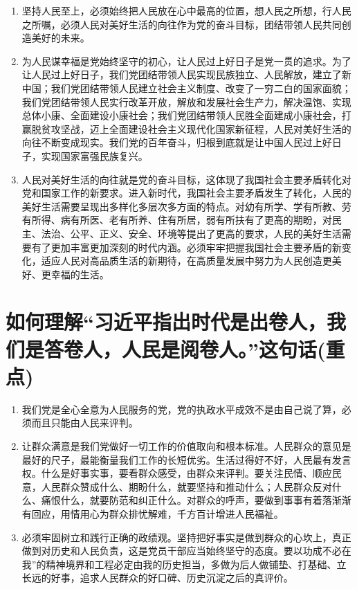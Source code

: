\documentclass[12pt, a4paper, oneside]{ctexbook}
\begin{document}
\begin{enumerate}
\item 坚持人民至上，必须始终把人民放在心中最高的位置，想人民之所想，行人民之所嘱，必须人民对美好生活的向往作为党的奋斗目标，团结带领人民共同创造美好的未来。

\item 为人民谋幸福是党始终坚守的初心，让人民过上好日子是党一贯的追求。为了让人民过上好日子，我们党团结带领人民实现民族独立、人民解放，建立了新中国；我们党团结带领人民建立社会主义制度、改变了一穷二白的国家面貌；我们党团结带领人民实行改革开放，解放和发展社会生产力，解决温饱、实现总体小康、全面建设小康社会；我们党团结带领人民胜全面建成小康社会，打赢脱贫攻坚战，迈上全面建设社会主义现代化国家新征程，人民对美好生活的向往不断变成现实。我们党的百年奋斗，归根到底就是让中国人民过上好日子，实现国家富强民族复兴。

\item 人民对美好生活的向往就是党的奋斗目标，这体现了我国社会主要矛盾转化对党和国家工作的新要求。进入新时代，我国社会主要矛盾发生了转化，人民的美好生活需要呈现出多样化多层次多方面的特点。对幼有所学、学有所教、劳有所得、病有所医、老有所养、住有所居，弱有所扶有了更高的期盼，对民主、法治、公平、正义、安全、环境等提出了更高的要求，人民的美好生活需要有了更加丰富更加深刻的时代内涵。必须牢牢把握我国社会主要矛盾的新变化，适应人民对高品质生活的新期待，在高质量发展中努力为人民创造更美好、更幸福的生活。
\end{enumerate}


\section{如何理解“习近平指出时代是出卷人，我们是答卷人，人民是阅卷人。”这句话(重点)}

\begin{enumerate}
\item 我们党是全心全意为人民服务的党，党的执政水平成效不是由自己说了算，必须而且只能由人民来评判。

\item 让群众满意是我们党做好一切工作的价值取向和根本标准。人民群众的意见是最好的尺子，最能衡量我们工作的长短优劣。生活过得好不好，人民最有发言权。什么是好事实事，要看群众感受，由群众来评判。要关注民情、顺应民意，人民群众赞成什么、期盼什么，就要坚持和推动什么；人民群众反对什么、痛恨什么，就要防范和纠正什么。对群众的呼声，要做到事事有着落渐渐有回应，用情用心为群众排忧解难，千方百计增进人民福祉。

\item 必须牢固树立和践行正确的政绩观。坚持把好事实是做到群众的心坎上，真正做到对历史和人民负责，这是党员干部应当始终坚守的态度。要以功成不必在我”的精神境界和工程必定由我的历史担当，多做为后人做铺垫、打基础、立长远的好事，追求人民群众的好口碑、历史沉淀之后的真评价。
\end{enumerate}
\end{document}
